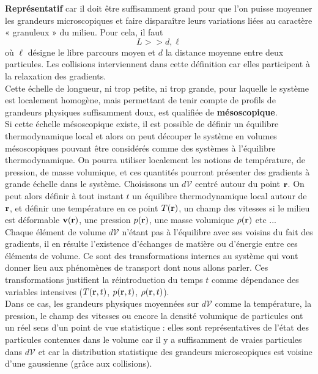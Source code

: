 \documentclass[11pt,a4paper]{report}
\begin{document}
	\textbf{Représentatif} car il doit être suffisamment grand pour que l'on puisse moyenner les 		grandeurs microscopiques et faire disparaître leurs variations liées au caractère « granuleux » 	du milieu. Pour cela, il faut
	\begin{equation}
		L >> d, \ell
	\end{equation}
	où $\ell$ désigne le libre parcours moyen et $d$ la distance moyenne entre deux particules. 		Les collisions interviennent dans cette définition car elles participent à la relaxation des 		gradients.\\
	 
	Cette échelle de longueur, ni trop petite, ni trop grande, pour laquelle le système est 			localement homogène, mais permettant de tenir compte de profils de grandeurs physiques 				suffisamment doux, est qualifiée de \textbf{mésoscopique}.\\
	
	Si cette échelle mésoscopique existe, il est possible de définir un équilibre thermodynamique 		local et alors on peut découper le système en volumes mésoscopiques pouvant être considérés 		comme des systèmes à l'équilibre thermodynamique. On pourra utiliser localement les notions de 		température, de pression, de masse volumique, et ces quantités pourront présenter des gradients 	à grande échelle dans le système. Choisissons un $d\mathcal{V}$ centré autour du point 
	$\bold{r}$. On peut alors définir à tout instant $t$ un équilibre thermodynamique local autour 		de $\bold{r}$, et définir une température en ce point $T(\bold{r})$, un champ des vitesses si 		le milieu est déformable $\bold{v}(\bold{r})$, une pression $p(\bold{r})$, une masse 				volumique $\rho(\bold{r})$ etc ...\\
	
	Chaque élément de volume $d\mathcal{V}$ n'étant pas à l'équilibre avec ses voisins du fait des 		gradients, il en résulte l'existence d'échanges de matière ou d'énergie entre ces éléments de 		volume. Ce sont des transformations internes au système qui vont donner lieu aux phénomènes de 		transport dont nous allons parler. Ces transformations justifient la réintroduction du temps 
	$t$ comme dépendance des variables intensives ($T(\bold{r},t)$, $p(\bold{r},t)$, 
	$\rho(\bold{r},t)$).\\ 
	
	Dans ce cas, les grandeurs physiques moyennées sur $d\mathcal{V}$ comme la température, la 			pression, le champ des vitesses ou encore la densité volumique de particules ont un réel sens 		d'un point de vue statistique : elles sont représentatives de l'état des particules contenues 		dans le volume car il y a suffisamment de vraies particules dans $d\mathcal{V}$ et car la 			distribution statistique des grandeurs microscopiques est voisine d'une gaussienne (grâce aux 		collisions).\\
	
\end{document}
